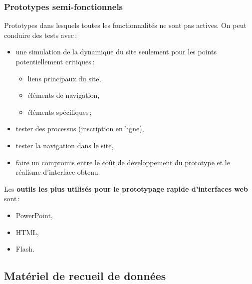 		\begin{frame}[allowframebreaks]
		\frametitle{Prototypes semi-fonctionnels \citep{ergolab2014a}}
		Prototypes dans lesquels toutes les fonctionnalités ne sont pas actives.  
		On peut conduire des tests avec\,:
			\begin {itemize}
				      \item une simulation de la dynamique du site seulement pour les points potentiellement critiques\,: 
				      		\begin {itemize}
				      		\item liens principaux du site, 
				      		\item éléments de navigation, 
				      		\item éléments spécifiques\,;
				      		\end{itemize}
				      	\item tester des processus (inscription en ligne),
				      	\item tester la navigation dans le site, 
				      	\item faire un compromis entre le coût de développement du prototype et le réalisme d'interface obtenu. 
			   
			\end{itemize}
			Les \textbf{outils les plus utilisés pour le prototypage rapide d'interfaces web} sont\,:
			\begin {itemize}
				      \item PowerPoint,
				      \item HTML,
				      \item Flash. 
			\end{itemize}
			
		\end{frame}   
		
		\subsection{Matériel de recueil de données} 
		
